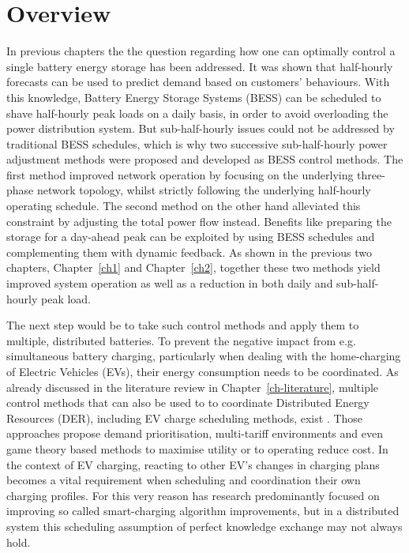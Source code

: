 \section{Overview}
\label{ch3:sec:overview}

In previous chapters the the question regarding how one can optimally control a single battery energy storage has been addressed.
It was shown that half-hourly forecasts can be used to predict demand based on customers' behaviours.
With this knowledge, Battery Energy Storage Systems (BESS) can be scheduled to shave half-hourly peak loads on a daily basis, in order to avoid overloading the power distribution system.
But sub-half-hourly issues could not be addressed by traditional BESS schedules, which is why two successive sub-half-hourly power adjustment methods were proposed and developed as BESS control methods.
The first method improved network operation by focusing on the underlying three-phase network topology, whilst strictly following the underlying half-hourly operating schedule.
The second method on the other hand alleviated this constraint by adjusting the total power flow instead.
Benefits like preparing the storage for a day-ahead peak can be exploited by using BESS schedules and complementing them with dynamic feedback.
As shown in the previous two chapters, Chapter~\ref{ch1} and Chapter~\ref{ch2}, together these two methods yield improved system operation as well as a reduction in both daily and sub-half-hourly peak load.

The next step would be to take such control methods and apply them to multiple, distributed batteries.
To prevent the negative impact from e.g. simultaneous battery charging, particularly when dealing with the home-charging of Electric Vehicles (EVs), their energy consumption needs to be coordinated.
As already discussed in the literature review in Chapter~\ref{ch-literature}, multiple control methods that can also be used to to coordinate Distributed Energy Resources (DER), including EV charge scheduling methods, exist \cite{Atia2016, Bidram2012, Bidram2014, Dolan2012, Gill2014, Guerrero2008, Guerrero2013, Sugihara2013, Toledo2013, Wang2016, Vovos2007, Guerrero2013a, Mansouri-Samani1993, Marra2013, Mokhtari2013}. 
Those approaches propose demand prioritisation, multi-tariff environments and even game theory based methods to maximise utility or to operating reduce cost.
In the context of EV charging, reacting to other EV's changes in charging plans becomes a vital requirement when scheduling and coordination their own charging profiles.
For this very reason has research predominantly focused on improving so called smart-charging algorithm improvements, but in a distributed system this scheduling assumption of perfect knowledge exchange may not always hold.

